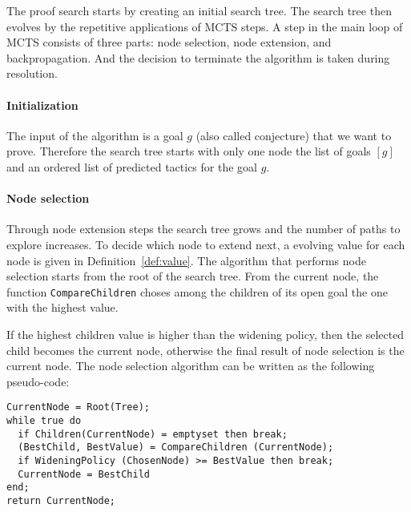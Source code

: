 \documentclass[runningheads,a4paper,draft]{svjour3}
\begin{document}
The proof search starts by creating an initial search tree. The search tree
then evolves by the repetitive applications of MCTS steps. A step in the main
loop of MCTS consists of three parts: node selection, node extension, and
backpropagation. And the decision to terminate the algorithm is taken during
resolution.

\paragraph{Initialization}
The input of the algorithm is a goal $g$ (also called conjecture) that we
want to prove.
Therefore the search tree starts with only one node the list of goals
$[g]$ and an ordered list of predicted tactics for the goal $g$.


\paragraph{Node selection}
Through node extension steps the search tree grows and the number of paths to
explore increases. To decide which node to extend next, a evolving value for
each node is given in Definition~\ref{def:value}. The algorithm that performs
node selection starts from the root of the search tree. From the current node,
the function \texttt{CompareChildren} choses among the children of its open
goal the one with the highest value.

If the highest children value is higher than the widening policy, then the
selected child
becomes the current node, otherwise the final result of node selection is the
current node. The node selection algorithm can be written as the following
pseudo-code:

\begin{lstlisting}[language=SMLSmall]
CurrentNode = Root(Tree);
while true do
  if Children(CurrentNode) = emptyset then break;
  (BestChild, BestValue) = CompareChildren (CurrentNode);
  if WideningPolicy (ChosenNode) >= BestValue then break;
  CurrentNode = BestChild
end;
return CurrentNode;
\end{lstlisting}
\end{document}
